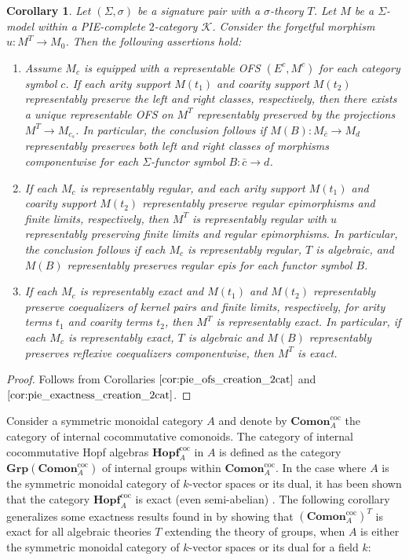 \documentclass[11pt]{article}
\theoremstyle{plain}
\newtheorem{corollary}[theorem]{Corollary}
\theoremstyle{definition}
\numberwithin{equation}{section}
\newcommand{\K}{\mathcal{K}}
\newcommand{\Hopf}{\mathbf{Hopf}}
\begin{document}
\begin{corollary}\label{cor:StructuresLiftedToBialgebras}
   Let $(\Sigma,\sigma)$ be a signature pair with a $\sigma$-theory $T$. Let $M$ be a $\Sigma$-model within a PIE-complete $2$-category $\K$. Consider the forgetful morphism $u\colon M^T\to M_0$. Then the following assertions hold:
   \begin{enumerate}
       \item Assume $M_c$ is equipped with a representable OFS $(E^c,M^c)$ for each category symbol $c$. If each arity support $M(t_1)$ and coarity support $M(t_2)$ representably preserve the left and right classes, respectively, then there exists a unique representable OFS on $M^T$ representably preserved by the projections $M^T\to M_{c_s}$. In particular, the conclusion follows if $M(B)\colon M_{\bar{c}}\to M_d$ representably preserves both left and right classes of morphisms componentwise for each $\Sigma$-functor symbol $B\colon \bar{c}\to d$. 
       \item If each $M_c$ is representably regular, and each arity support $M(t_1)$ and coarity support $M(t_2)$ representably preserve regular epimorphisms and finite limits, respectively, then $M^T$ is representably regular with $u$ representably preserving finite limits and regular epimorphisms. In particular, the conclusion follows if each $M_c$ is representably regular, $T$ is algebraic, and $M(B)$ representably preserves regular epis for each functor symbol $B$.
       \item If each $M_c$ is representably exact and $M(t_1)$ and $M(t_2)$ representably preserve coequalizers of kernel pairs and finite limits, respectively, for arity terms $t_1$ and coarity terms $t_2$, then $M^T$ is representably exact. In particular, if each $M_c$ is representably exact, $T$ is algebraic and $M(B)$ representably preserves reflexive coequalizers componentwise, then $M^T$ is exact.
   \end{enumerate}
\end{corollary}
\begin{proof}
   Follows from Corollaries $\ref{cor:pie_ofs_creation_2cat}$ and $\ref{cor:pie_exactness_creation_2cat}$. 
\end{proof}

Consider a symmetric monoidal category $A$ and denote by $\textbf{Comon}^{\mathrm{coc}}_A$ the category of internal cocommutative comonoids. The category of internal cocommutative Hopf algebras $\Hopf_A^{\mathrm{coc}}$ in $A$ is defined as the category $\textbf{Grp}(\textbf{Comon}^{\mathrm{coc}}_A)$ of internal groups within $\textbf{Comon}^{\mathrm{coc}}_A$. In the case where $A$ is the symmetric monoidal category of $k$-vector spaces or its dual, it has been shown that the category $\Hopf^{\mathrm{coc}}_A$ is exact (even semi-abelian) \cite{GRAN20194171, forsman2026semiabeliannessaffinegroupschemes}. The following corollary generalizes some exactness results found in \cite{bevilacqua2025coalgebraicmodelsomegagroups, gran2025hopfbracessemiabeliancategories} by showing that $(\textbf{Comon}^{\mathrm{coc}}_A)^T$ is exact for all algebraic theories $T$ extending the theory of groups, when $A$ is either the symmetric monoidal category of $k$-vector spaces or its dual for a field $k$:
\end{document}
